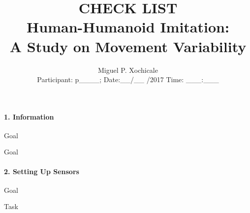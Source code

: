 \documentclass[a4paper]{article}
\begin{document}
\title{\vspace{-35mm} CHECK LIST \\ Human-Humanoid Imitation: \\ A Study on Movement Variability }
\author{Miguel P. Xochicale  \\ Participant: p\_\_\_\_; Date:\_\_/\_\_ /2017 Time: \_\_\_:\_\_\_ }
\date{}
\maketitle

\thispagestyle{empty} %



\paragraph{1. Information}

\begin{CheckList}{Goal}
\begin{minipage}[t]{0.5\textwidth}
\end{minipage}
\hspace{0.5cm}
\begin{minipage}[t]{0.5\textwidth}
\end{minipage}
\end{CheckList}


\vspace{-2mm}

\begin{CheckList}{Goal}
\begin{minipage}[t]{0.5\textwidth}
\end{minipage}
\hspace{0.5cm}
\begin{minipage}[t]{0.5\textwidth}
\end{minipage}
\end{CheckList}



\paragraph{2. Setting Up Sensors}


\begin{CheckList}{Goal}
\begin{CheckList}[layout=table]{Task}
\end{CheckList}
\end{CheckList}
\end{document}
